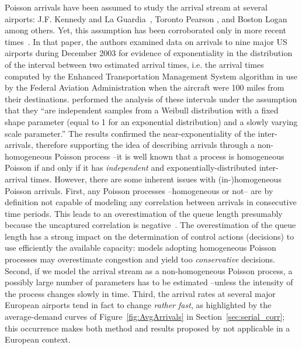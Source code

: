 \documentclass[final,review]{elsarticle}
\makeatletter
\newcommand*{\ie}{i.e.\@\xspace}
\makeatother
\begin{document}
Poisson arrivals have been assumed to study the arrival stream at several airports:  J.F. Kennedy and La Guardia~\citep{Koop1972}, Toronto Pearson \citep{Bookbinder1986}, and Boston Logan~\citep{HO1975} among others. Yet, this assumption has been corroborated only in more recent times~\citep{willemain2004statistical}.
In that paper, the authors examined data on arrivals to nine major US airports during December 2003 for evidence of exponentiality in the distribution of the interval between two estimated arrival times, \ie{} the arrival times computed by the Enhanced Transportation Management System algorithm in use by the Federal Aviation Administration when the aircraft were 100 miles from their destinations. \citet{willemain2004statistical} performed the analysis of these intervals under the assumption that they ``are independent samples from a Weibull distribution with a fixed shape parameter (equal to 1 for an exponential distribution) and a slowly varying scale parameter.''
The results confirmed the near-exponentiality of the inter-arrivals, therefore supporting the idea of describing arrivals through a non-homogeneous Poisson process --it is well known that a process is homogeneous Poisson if and only if it has \emph{independent} and exponentially-distributed inter-arrival times.
However, there are some inherent issues with (in-)homogeneous Poisson arrivals.
First, any Poisson processes --homogeneous or not-- are by definition not capable of modeling any correlation between arrivals in consecutive time periods.
This leads to an overestimation of the queue length presumably because the uncaptured correlation is negative~\citep{caccavale2014model}.
The overestimation of the queue length has a strong impact on the determination of control actions (decisions) to use efficiently the available capacity: models adopting homogeneous Poisson processes may overestimate congestion and yield too \emph{conservative} decisions.
Second, if we model the arrival stream as a non-homogeneous Poisson process, a possibly large number of parameters has to be estimated --unless the intensity of the process changes slowly in time. %
Third, the arrival rates at several major European airports tend in fact to change \emph{rather fast}, as highlighted by the average-demand curves of Figure~\ref{fig:AvgArrivals} in Section~\ref{sec:serial_corr}; this occurrence makes both method and results proposed by \citet{willemain2004statistical} not applicable in a European context.
\end{document}
